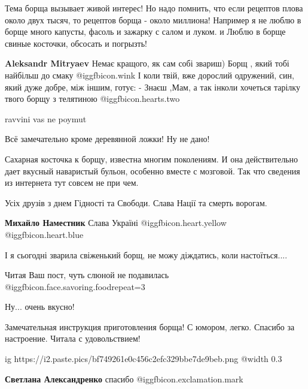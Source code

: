 \begin{itemize}

Тема борща вызывает живой интерес! Но надо помнить, что если рецептов плова
около двух тысяч, то рецептов борща - около миллиона! Например я не люблю в
борще много капусты, фасоль и зажарку с салом и луком. и Люблю в борще свиные
косточки, обсосать и погрызть!

\begin{itemize} %
\textbf{Aleksandr Mitryaev}
Немає кращого, як сам собі звариш) Борщ , який тобі найбільш до смаку  @igg{fbicon.wink} 
І коли твій, вже дорослий одружений, син, який дуже добре, між іншим, готує:
- Знаєш ,Мам, а так інколи хочеться тарілку твого борщу з телятиною  @igg{fbicon.hearts.two} 

ravvini vas ne poymut
\end{itemize} %

Всё замечательно кроме деревянной ложки! Ну не дано!


Сахарная косточка к борщу, известна многим поколениям. И она действительно дает
вкусный наваристый бульон, особенно вместе с мозговой. Так что сведения из
интернета тут совсем не при чем.


Усіх друзів з днем Гідності та Свободи.
Слава Нації та смерть ворогам.

\textbf{Михайло Наместник} Слава Україні  @igg{fbicon.heart.yellow}  @igg{fbicon.heart.blue} 

І я сьогодні зварила свіженький борщ, не можу діждатись, коли настоїться....


Читая Ваш пост, чуть слюной не подавилась @igg{fbicon.face.savoring.food}{repeat=3} 

Ну... очень вкусно!


Замечательная инструкция приготовления борща! С юмором, легко. Спасибо за
настроение. Читала с удовольствием!

\ifcmt
  ig https://i2.paste.pics/bf749261e0c456c2efc329bbe7de9beb.png
  @width 0.3
\fi

\textbf{Светлана Александренко} спасибо @igg{fbicon.exclamation.mark}



\end{itemize}

